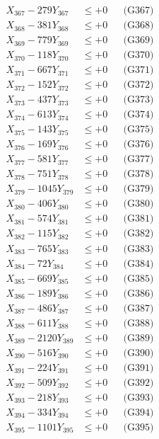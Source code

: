 \documentclass[a4paper,10pt]{article}
\begin{document}
{\begin{align}
X_{367} - 279Y_{367} &\leq +0 && \text{(G367)} \\
X_{368} - 381Y_{368} &\leq +0 && \text{(G368)} \\
X_{369} - 779Y_{369} &\leq +0 && \text{(G369)} \\
X_{370} - 118Y_{370} &\leq +0 && \text{(G370)} \\
\allowbreak
X_{371} - 667Y_{371} &\leq +0 && \text{(G371)} \\
X_{372} - 152Y_{372} &\leq +0 && \text{(G372)} \\
X_{373} - 437Y_{373} &\leq +0 && \text{(G373)} \\
X_{374} - 613Y_{374} &\leq +0 && \text{(G374)} \\
X_{375} - 143Y_{375} &\leq +0 && \text{(G375)} \\
X_{376} - 169Y_{376} &\leq +0 && \text{(G376)} \\
X_{377} - 581Y_{377} &\leq +0 && \text{(G377)} \\
X_{378} - 751Y_{378} &\leq +0 && \text{(G378)} \\
X_{379} - 1045Y_{379} &\leq +0 && \text{(G379)} \\
X_{380} - 406Y_{380} &\leq +0 && \text{(G380)} \\
\allowbreak
X_{381} - 574Y_{381} &\leq +0 && \text{(G381)} \\
X_{382} - 115Y_{382} &\leq +0 && \text{(G382)} \\
X_{383} - 765Y_{383} &\leq +0 && \text{(G383)} \\
X_{384} - 72Y_{384} &\leq +0 && \text{(G384)} \\
X_{385} - 669Y_{385} &\leq +0 && \text{(G385)} \\
X_{386} - 189Y_{386} &\leq +0 && \text{(G386)} \\
X_{387} - 486Y_{387} &\leq +0 && \text{(G387)} \\
X_{388} - 611Y_{388} &\leq +0 && \text{(G388)} \\
X_{389} - 2120Y_{389} &\leq +0 && \text{(G389)} \\
X_{390} - 516Y_{390} &\leq +0 && \text{(G390)} \\
\allowbreak
X_{391} - 224Y_{391} &\leq +0 && \text{(G391)} \\
X_{392} - 509Y_{392} &\leq +0 && \text{(G392)} \\
X_{393} - 218Y_{393} &\leq +0 && \text{(G393)} \\
X_{394} - 334Y_{394} &\leq +0 && \text{(G394)} \\
X_{395} - 1101Y_{395} &\leq +0 && \text{(G395)} \\

\end{align}}
\end{document}
